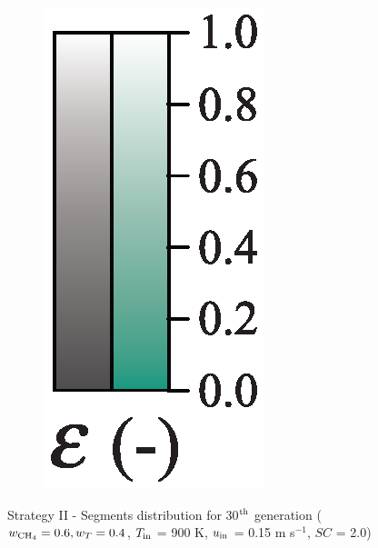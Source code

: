 \documentclass[preprint,12pt]{elsarticle}
\begin{document}
\begin{figure}[h!]
\begin{subfigure}[b]{0.1\textwidth}
     	\includegraphics[width=\textwidth]{segments_porosity.eps}
     \end{subfigure}
\caption{\label{fig:30L6040G1-TField} Strategy II - Segments distribution for 30$^{\rm{th}}$ generation ($w_{\rm{CH_4}} = 0.6, w_T = 0.4$, $T_{\rm{in}}$ = 900 K, $u_{\rm{in}}$ = 0.15 m s$^{-1}$, $SC$ = 2.0)}
\end{figure}
\end{document}
